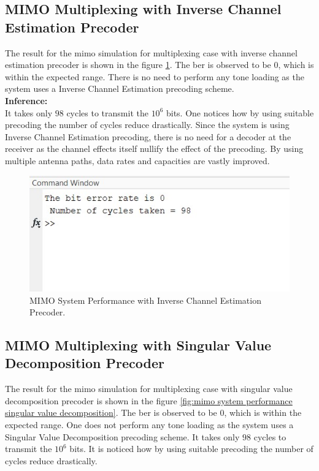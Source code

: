 \subsection{MIMO Multiplexing with Inverse Channel Estimation Precoder}

The result for the \acrshort{mimo} simulation for multiplexing case with inverse channel estimation precoder is shown in the figure \ref{fig:mimo system performance inverse channel estimation}. The \acrshort{ber} is observed to be $0$, which is within the expected range. There is no need to perform any tone loading as the system uses a Inverse Channel Estimation precoding scheme.\\

\textbf{Inference:}\\
It takes only $98$ cycles to transmit the $10^6$ bits. One notices how by using suitable precoding the number of cycles reduce drastically. Since the system is using Inverse Channel Estimation precoding, there is no need for a decoder at the receiver as the channel effects itself nullify the effect of the precoding. By using multiple antenna paths, data rates and capacities are vastly improved.

\begin{figure}[!htbp]
\centering
\includegraphics[scale=1]{Chapter 4/Figures/MIMO System Performance Inverse Channel Estimation}
\caption{MIMO System Performance with Inverse Channel Estimation Precoder.}
\label{fig:mimo system performance inverse channel estimation}
\end{figure}

\subsection{MIMO Multiplexing with Singular Value Decomposition Precoder}

The result for the \acrshort{mimo} simulation for multiplexing case with singular value decomposition precoder is shown in the figure \ref{fig:mimo system performance singular value decomposition}. The \acrshort{ber} is observed to be $0$, which is within the expected range. One does not perform any tone loading as the system uses a Singular Value Decomposition precoding scheme. It takes only $98$ cycles to transmit the $10^6$ bits. It is noticed how by using suitable precoding the number of cycles reduce drastically.\\

